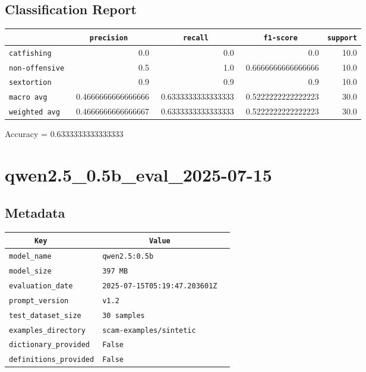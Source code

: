 \documentclass{article}
\begin{document}
\subsection{Classification Report}

\begin{center}
\begin{tabular}{l | r | r | r | r} \hline
    \verb|            | & \verb|    precision     | & \verb|      recall      | & \verb|     f1-score     | & \verb|support| \\ \hline
    \hline
    \verb|catfishing | & 0.0 & 0.0 & 0.0 &    10.0 \\ \hline
    \verb|non-offensive| & 0.5 & 1.0 & 0.6666666666666666 &    10.0 \\ \hline
    \verb|sextortion | & 0.9 & 0.9 & 0.9 &    10.0 \\ \hline
    \verb|macro avg  | & 0.4666666666666666 & 0.6333333333333333 & 0.5222222222222223 &    30.0 \\ \hline
    \verb|weighted avg| & 0.4666666666666667 & 0.6333333333333333 & 0.5222222222222223 &    30.0 \\ \hline
\end{tabular}
\end{center}

\begin{center}
Accuracy = 0.6333333333333333
\end{center}

\section{qwen2.5\_0.5b\_eval\_2025-07-15}
\subsection{Metadata}

\begin{center}
\begin{tabular}{l | l} \hline
    \verb|      Key      | & \verb|           Value           | \\ \hline
    \hline
    \verb|model_name    | & \verb|qwen2.5:0.5b                 | \\ \hline
    \verb|model_size    | & \verb|397 MB                       | \\ \hline
    \verb|evaluation_date| & \verb|2025-07-15T05:19:47.203601Z  | \\ \hline
    \verb|prompt_version| & \verb|v1.2                         | \\ \hline
    \verb|test_dataset_size| & \verb|30 samples                   | \\ \hline
    \verb|examples_directory| & \verb|scam-examples/sintetic       | \\ \hline
    \verb|dictionary_provided| & \verb|False                        | \\ \hline
    \verb|definitions_provided| & \verb|False                        | \\ \hline
\end{tabular}
\end{center}
\end{document}
